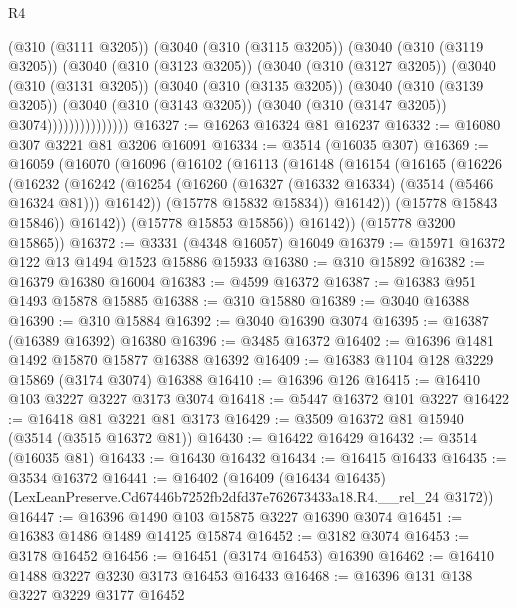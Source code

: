 \begin{lexlean}{R4}
\begin{coremodule}
                (@310 (@3111 @3205))
                (@3040
                  (@310 (@3115 @3205))
                  (@3040
                    (@310 (@3119 @3205))
                    (@3040
                      (@310 (@3123 @3205))
                      (@3040
                        (@310 (@3127 @3205))
                        (@3040
                          (@310 (@3131 @3205))
                          (@3040
                            (@310 (@3135 @3205))
                            (@3040
                              (@310 (@3139 @3205))
                              (@3040
                                (@310 (@3143 @3205))
                                (@3040 (@310 (@3147 @3205)) @3074)))))))))))))))
@16327 := @16263 @16324 @81 @16237
@16332 := @16080 @307 @3221 @81 @3206 @16091
@16334 := @3514 (@16035 @307)
@16369 := @16059
    (@16070
      (@16096
        (@16102
          (@16113
            (@16148
              (@16154
                (@16165
                  (@16226
                    (@16232
                      (@16242
                        (@16254 (@16260 (@16327 (@16332 @16334) (@3514 (@5466 @16324 @81))) @16142))
                        (@15778 @15832 @15834))
                      @16142))
                  (@15778 @15843 @15846))
                @16142))
            (@15778 @15853 @15856))
          @16142))
      (@15778 @3200 @15865))
@16372 := @3331 (@4348 @16057) @16049
@16379 := @15971 @16372 @122 @13 @1494 @1523 @15886 @15933
@16380 := @310 @15892
@16382 := @16379 @16380 @16004
@16383 := @4599 @16372
@16387 := @16383 @951 @1493 @15878 @15885
@16388 := @310 @15880
@16389 := @3040 @16388
@16390 := @310 @15884
@16392 := @3040 @16390 @3074
@16395 := @16387 (@16389 @16392) @16380
@16396 := @3485 @16372
@16402 := @16396 @1481 @1492 @15870 @15877 @16388 @16392
@16409 := @16383 @1104 @128 @3229 @15869 (@3174 @3074) @16388
@16410 := @16396 @126
@16415 := @16410 @103 @3227 @3227 @3173 @3074
@16418 := @5447 @16372 @101 @3227
@16422 := @16418 @81 @3221 @81 @3173
@16429 := @3509 @16372 @81 @15940 (@3514 (@3515 @16372 @81))
@16430 := @16422 @16429
@16432 := @3514 (@16035 @81)
@16433 := @16430 @16432
@16434 := @16415 @16433
@16435 := @3534 @16372
@16441 := @16402
    (@16409 (@16434 @16435) (LexLeanPreserve.Cd67446b7252fb2dfd37e762673433a18.R4.__rel_24 @3172))
@16447 := @16396 @1490 @103 @15875 @3227 @16390 @3074
@16451 := @16383 @1486 @1489 @14125 @15874
@16452 := @3182 @3074
@16453 := @3178 @16452
@16456 := @16451 (@3174 @16453) @16390
@16462 := @16410 @1488 @3227 @3230 @3173 @16453 @16433
@16468 := @16396 @131 @138 @3227 @3229 @3177 @16452

\end{coremodule}
\end{lexlean}
